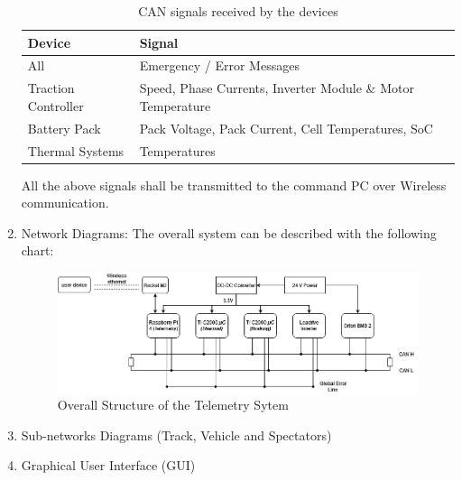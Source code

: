 \begin{enumerate}
\begin{table}[htbp]
    \centering
    \begin{tabular}{|l|l|}
        \toprule
        \textbf{Device} & \textbf{Signal} \\
        \midrule
        All & Emergency / Error Messages \\
        Traction Controller & Speed, Phase Currents, Inverter Module \& Motor Temperature \\
        Battery Pack & Pack Voltage, Pack Current, Cell Temperatures, SoC \\
        Thermal Systems & Temperatures \\
        \bottomrule
    \end{tabular}
    \caption{CAN signals received by the devices}
\label{tab:CAN signals.}
\end{table}

All the above signals shall be transmitted to the command PC over Wireless communication.

    \item Network Diagrams:
The overall system can be described with the following chart:
\begin{figure}
    \centering
    \includegraphics[width=\textwidth]{texfiles/elec/eimg/telemetrysystems.png}
    \caption{Overall Structure of the Telemetry Sytem}
    \label{fig:enter-label}
\end{figure}
    \item Sub-networks Diagrams (Track, Vehicle and Spectators)

    \item Graphical User Interface (GUI)
\end{enumerate}




